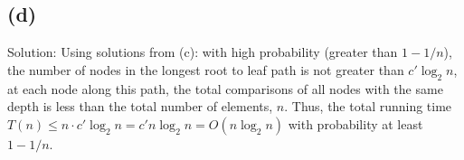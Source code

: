 \documentclass[11pt]{537homework}
\begin{document}

\subsection*{(d)}

Solution: Using solutions from (c): with high probability (greater than $1 - 1/n$), the number of nodes in the longest root to leaf path is not greater than $c'\log_2{n}$, at each node along this path, the total comparisons of all nodes with the same depth is less than the total number of elements, $n$. Thus, the total running time $T(n) \leq n\cdot c'\log_2{n} = c'n\log_2{n} = O(n\log_2{n})$ with probability at least $1-1/n$.  
\end{document}
